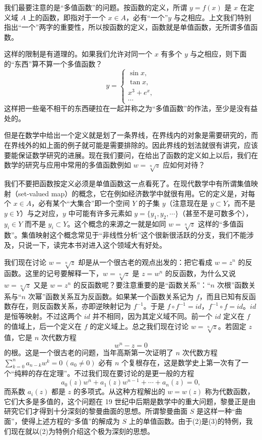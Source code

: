 我们最要注意的是“多值函数”的问题。按函数的定义，所谓 $y=f(x)$ 是 $x$ 在定义域 $A$ 上的函数，即指对于一个 $x\in A$，必有“一个”$y$ 与之相应。上文我们特别指出“一个”两字的重要性，所以按函数的定义，函数就是单值函数，无所谓多值函数。

这样的限制是有道理的。如果我们允许对同一个 $x$ 有多个 $y$ 与之相应，则下面的“东西”算不算一个多值函数？
\begin{equation}
 y=\begin{cases}
 \sin x,\\
 \tan x,\\
 x^3+e^x,\\
 \cdots
 \end{cases}
 \tag{1}
\end{equation}
这样把一些毫不相干的东西硬拉在一起并称之为“多值函数”的作法，至少是没有益处的。

但是在数学中给出一个定义就是划了一条界线，在界线内的对象是需要研究的，而在界线外的如上面的例子就可能是需要排除的。因此界线的划法就很有讲究，应该要能保证数学研究的进展。现在我们要问，在给出了函数的定义如上以后，我们在数学的研究与应用中常用的多值函数例如 $w=\sqrt[n]{z}$ 应如何对待？

我们不要把函数按定义必须是单值函数这一点看死了。在现代数学中有所谓集值映射（set-valued map）的概念，它在例如经济数学中就很有用。它的定义是，对每个 $x\in A$，必有某个“大集合”即一个空间 $Y$ 的子集 $y$（注意现在是 $y\subset Y$，而不是 $y\in Y$）与之对应，$y$ 中可能有许多元素如 $y=\{y_1,y_2,\cdots\}$（甚至不是可数多个），$y_i\in Y$ 而不是 $y_i\subset Y$。这个概念的来源之一就是如同 $w=\sqrt[n]{z}$ 这样的“多值函数”。集值映射这个概念常见于“非线性分析”这个很新很活跃的分支，我们不能涉及，只说一下，读完本书对进入这个领域大有好处。

我们现在讨论 $w=\sqrt[n]{z}$ 却是从一个很古老的观点出发的：把它看成 $w=z^n$ 的反函数。这里的记号要解释一下，$w=\sqrt[n]{z}$ 是 $z=w^n$ 的反函数，为什么又说 $w=\sqrt[n]{z}$ 又是 $w=z^n$ 的反函数呢？要注意重要的是“函数关系”：“$n$ 次根”函数关系与“$n$ 次幂”函数关系互为反函数。如果某一个函数关系记为 $f$，而且已知有反函数存在，则反函数关系，亦即逆映射记为 $f^{-1}$。于是 $f\circ f^{-1}=id$，$f^{-1}\circ f=id$。$id$ 是恒等映射。不过这两个 $id$ 并不相同，因为其定义域不同。前一个 $id$ 定义在 $f$ 的值域上，后一个定义在 $f$ 的定义域上。总之我们现在讨论 $w=\sqrt[n]{z}$。若固定 $z$ 值，它是 $n$ 次代数方程
\begin{equation}
 w^n-z=0
 \tag{2}
\end{equation}
的根。这是一个很古老的问题，当年高斯第一次证明了 $n$ 次代数方程\newline $\sum_{k=0}^{n}a_{n-k}w^k=0\ (a_0\ne0)$ 必有 $n$ 个复根存在，这是数学史上第一次有了一个“纯粹的存在定理”。不过我们现在要讨论的是更一般的方程
\begin{equation}
 a_0(z)w^n+a_1(z)w^{n-1}+\cdots+a_n(z)=0,
 \tag{3}
\end{equation}
而系数 $a_i(z)$ 都是 $z$ 的多项式。从这种方程解出的 $w=w(z)$ 称为代数函数，它们大多是多值的，这个问题在 19 世纪中后期是数学中的重大问题，黎曼正是由研究它们才得到十分深刻的黎曼曲面的思想。所谓黎曼曲面 $S$ 是这样一种“曲面”，使得上述方程的“多值”的解成为 $S$ 上的单值函数。由于(2)是(3)的特例，我们现在就以(2)为特例介绍这个极为深刻的思想。


